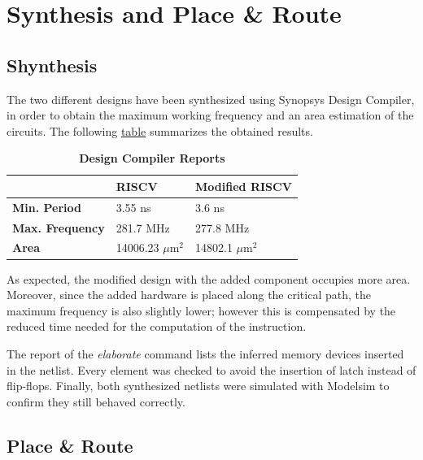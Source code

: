 %
\chapter{Synthesis and Place \& Route}
\label{cha6}

\section{Shynthesis}

The two different designs have been synthesized using Synopsys Design Compiler, in order to obtain the maximum working frequency and an area estimation of the circuits.
The following \hyperref[tab:performance]{table} summarizes the obtained results.  
\\
\begin{table}[h!]
    \centering
    \begin{tabular}{m{3cm} m{3cm} m{3cm}}
    \hline
         & \textbf{RISCV} & \textbf{Modified RISCV}\\
         \hline
         \textbf{Min. Period} & 3.55 ns & 3.6 ns\\
         \textbf{Max. Frequency} & 281.7 MHz& 277.8 MHz \\
         \textbf{Area} & 14006.23 $\mu$m$^{2}$ & 14802.1 $\mu$m$^{2}$ \\
         \hline
    \end{tabular}
    \caption{\textbf{Design Compiler Reports}}
  \label{tab:performance}
\end{table}

As expected, the modified design with the added component occupies more area. Moreover, since the added hardware is placed along the critical path, 
the maximum frequency is also slightly lower; however this is compensated by the reduced time needed for the computation of the instruction.

The report of the \emph{elaborate} command lists the inferred memory devices inserted in the netlist. Every element was checked to avoid the insertion of latch instead of 
flip-flops.
Finally, both synthesized netlists were simulated with Modelsim to confirm they still behaved correctly.

\section{Place \& Route}

